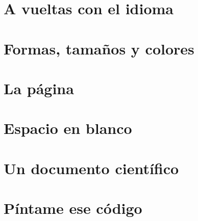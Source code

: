 \documentclass[a4paper,10pt]{book}
\begin{document}
\chapter{A vueltas con el idioma}\label{ch:idioma}


\chapter{Formas, tamaños y colores}


\chapter{La página}


\chapter{Espacio en blanco}\label{ch:blanco}


\chapter{Un documento científico}


\chapter{Píntame ese código}


%

%

%

%
\end{document}
